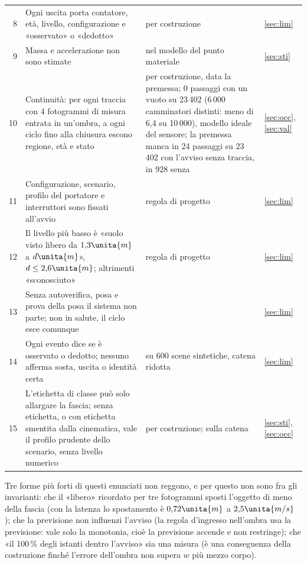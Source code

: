 \begin{table}[H]
\begin{tabularx}{\linewidth}{@{}rLLp{1.1cm}@{}}
8 & Ogni uscita porta contatore, età, livello, configurazione e «osservato» o «dedotto» & per costruzione & \ref{sec:lim}\\
9 & Massa e accelerazione non sono stimate &  nel modello del punto materiale & \ref{sec:sti}\\
10 & Continuità: per ogni traccia con 4 fotogrammi di misura entrata in un'ombra, a ogni ciclo fino alla chiusura escono regione, età e stato & per costruzione, data la premessa;  0 passaggi con un vuoto su 23\,402 (6\,000 camminatori distinti: meno di 6,4 su 10\,000), modello ideale del sensore; la premessa manca in 24 passaggi su 23\,402 con l'avviso senza traccia, in 928 senza & \ref{sec:occ}, \ref{sec:val}\\
11 & Configurazione, scenario, profilo del portatore e interruttori sono fissati all'avvio & regola di progetto & \ref{sec:lim}\\
12 & Il livello più basso è «suolo visto libero da $1{,}3\unita{m}$ a $d\unita{m}$», $d\le2{,}6\unita{m}$; altrimenti «sconosciuto» & regola di progetto & \ref{sec:lim}\\
13 & Senza autoverifica, posa e prova della posa il sistema non parte; non in salute, il ciclo esce comunque &  & \ref{sec:lim}\\
14 & Ogni evento dice se è osservato o dedotto; nessuno afferma sosta, uscita o identità certa &  su 600 scene sintetiche, catena ridotta & \ref{sec:lim}\\
15 & L'etichetta di classe può solo allargare la fascia; senza etichetta, o con etichetta smentita dalla cinematica, vale il profilo prudente dello scenario, senza livello numerico & per costruzione;  sulla catena & \ref{sec:sti}, \ref{sec:occ}\\
\bottomrule
\end{tabularx}
\end{table}

Tre forme più forti di questi enunciati non reggono, e per questo non sono fra gli invarianti: che il «libero» ricordato per tre fotogrammi sposti l'oggetto di meno della fascia (con la latenza lo spostamento è $0{,}72\unita{m}$ a $2{,}5\unita{m/s}$ ); che la previsione non influenzi l'avviso (la regola d'ingresso nell'ombra usa la previsione: vale solo la monotonia, cioè la previsione accende e non restringe); che «il 100\,\% degli istanti dentro l'avviso» sia una misura (è una conseguenza della costruzione finché l'errore dell'ombra non supera $w$ più mezzo corpo).

